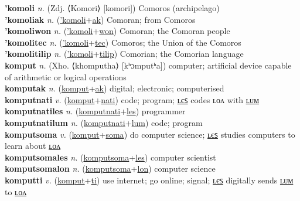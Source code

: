 \textbf{'komoli} \textit{n.} (Zdj. ⟨Komori⟩ [komori])
Comoros (archipelago) \label{'komoli} \\
\textbf{'komoliak} \textit{n.} (\hyperref['komoli]{'komoli}+\hyperref[ak]{ak})
Comoran; from Comoros \label{'komoliak} \\
\textbf{'komoliwon} \textit{n.} (\hyperref['komoli]{'komoli}+\hyperref[won]{won})
Comoran; the Comoran people \label{'komoliwon} \\
\textbf{'komolitec} \textit{n.} (\hyperref['komoli]{'komoli}+\hyperref[tec]{tec})
Comoros; the Union of the Comoros \label{'komolitec} \\
\textbf{'komolitilip} \textit{n.} (\hyperref['komoli]{'komoli}+\hyperref[tilip]{tilip})
Comorian; the Comorian language \label{'komolitilip} \\
\textbf{komput} \textit{n.} (Xho. ⟨khomputha⟩ [kʰɔmputʰa])
computer; artificial device capable of arithmetic or logical operations \label{komput} \\
\textbf{komputak} \textit{n.} (\hyperref[komput]{komput}+\hyperref[ak]{ak})
digital; electronic; computerised \label{komputak} \\
\textbf{komputnati} \textit{v.} (\hyperref[komput]{komput}+\hyperref[nati]{nati})
code; program; \hyperref[komputnatiles]{ʟєꜱ} codes ʟᴏᴧ with \hyperref[komputnatilum]{ʟᴜᴍ} \label{komputnati} \\
\textbf{komputnatiles} \textit{n.} (\hyperref[komputnati]{komputnati}+\hyperref[les]{les})
programmer \label{komputnatiles} \\
\textbf{komputnatilum} \textit{n.} (\hyperref[komputnati]{komputnati}+\hyperref[lum]{lum})
code; program \label{komputnatilum} \\
\textbf{komputsoma} \textit{v.} (\hyperref[komput]{komput}+\hyperref[soma]{soma})
do computer science; \hyperref[komputsomales]{ʟєꜱ} studies computers to learn about \hyperref[komputsomalon]{ʟᴏᴧ} \label{komputsoma} \\
\textbf{komputsomales} \textit{n.} (\hyperref[komputsoma]{komputsoma}+\hyperref[les]{les})
computer scientist \label{komputsomales} \\
\textbf{komputsomalon} \textit{n.} (\hyperref[komputsoma]{komputsoma}+\hyperref[lon]{lon})
computer science \label{komputsomalon} \\
\textbf{komputti} \textit{v.} (\hyperref[komput]{komput}+\hyperref[ti]{ti})
use internet; go online; signal; \hyperref[komputtiles]{ʟєꜱ} digitally sends \hyperref[komputtilum]{ʟᴜᴍ} to \hyperref[komputtilon]{ʟᴏᴧ} \label{komputti} \\
